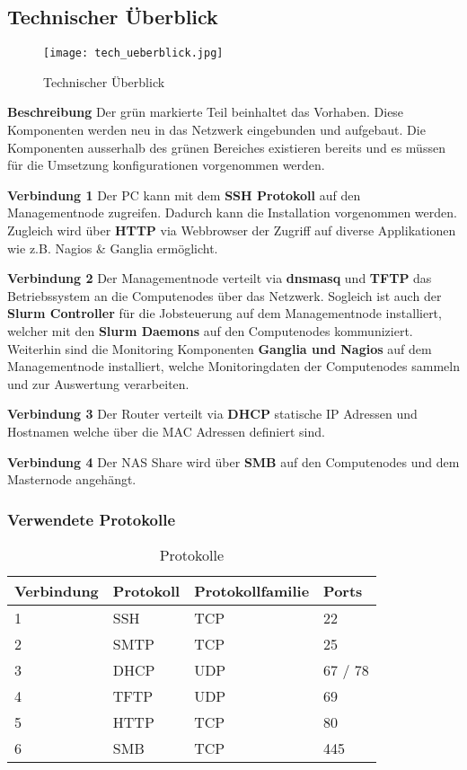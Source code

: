 \subsection{Technischer Überblick}
\begin{figure}[H]
\centering
\texttt{[image: tech\_ueberblick.jpg]}
\caption{Technischer Überblick}
\label{fig:Technischer Überblick}
\end{figure} 

\textbf{Beschreibung}\newline
Der grün markierte Teil beinhaltet das Vorhaben. Diese Komponenten werden neu in das Netzwerk eingebunden und aufgebaut. Die Komponenten ausserhalb des grünen Bereiches existieren bereits und es müssen für die Umsetzung konfigurationen vorgenommen werden.

\textbf{Verbindung 1} \newline
Der PC kann mit dem \textbf{SSH Protokoll} auf den Managementnode zugreifen. Dadurch kann die Installation vorgenommen werden. Zugleich wird über \textbf{HTTP} via Webbrowser der Zugriff auf diverse Applikationen wie z.B. Nagios \& Ganglia ermöglicht.

\textbf{Verbindung 2} \newline
Der Managementnode verteilt via \textbf{dnsmasq} und  \textbf {TFTP} das Betriebssystem an die Computenodes über das Netzwerk. Sogleich ist auch der \textbf{Slurm Controller} für die Jobsteuerung auf dem Managementnode installiert, welcher mit den \textbf{Slurm Daemons} auf den Computenodes kommuniziert. Weiterhin sind die Monitoring Komponenten \textbf{Ganglia und Nagios} auf dem Managementnode installiert, welche Monitoringdaten der Computenodes sammeln und zur Auswertung verarbeiten.

\textbf{Verbindung 3} \newline
Der Router verteilt via \textbf{DHCP} statische IP Adressen und Hostnamen welche über die MAC Adressen definiert sind.

\textbf{Verbindung 4} \newline
Der NAS Share wird über \textbf{SMB} auf den Computenodes und dem Masternode angehängt.

\subsubsection{Verwendete Protokolle}
\begin{table}[H]
\centering
\begin{tabular}{p{2cm}p{4cm}p{5cm}p{5cm}}
\hline
\rowcolor{heading} \textbf{Verbindung} & \textbf{Protokoll} & \textbf{Protokollfamilie} & \textbf{Ports} \\\hline
1 & SSH & TCP & 22 \\\hline
2 & SMTP & TCP & 25 \\\hline
3 & DHCP & UDP & 67 / 78 \\\hline
4 & TFTP & UDP & 69 \\\hline
5 & HTTP & TCP & 80 \\\hline
6 & SMB & TCP & 445 \\\hline
\end{tabular}
\caption{Protokolle}
\end{table}
